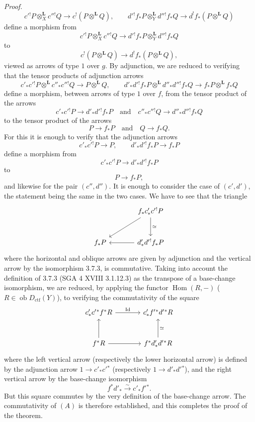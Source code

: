 \documentclass[11pt]{article}
\newenvironment{prooftext}[1][Proof]{\par\noindent\emph{#1.}\ }{\par\medskip}
\DeclareMathOperator{\Hom}{Hom}
\newcommand{\ob}{\operatorname{ob}}
\providecommand{\Dctf}{D_{\mathrm{ctf}}}
\providecommand{\Id}{\mathrm{Id}}
\providecommand{\lisom}{\xrightarrow{\sim}}
\providecommand{\Dctf}{D_{\mathrm{ctf}}}
\providecommand{\Hom}{\operatorname{Hom}}
\providecommand{\ob}{\operatorname{ob}}
\providecommand{\Hom}{\operatorname{Hom}}
\begin{document}
\begin{prooftext}[Proof]
\[
c'{}^!P\otimes_X^{\mathbf L}c''{}^!Q\longrightarrow c^!(P\otimes^{\mathbf L}Q),\qquad
d'{}^!f_*P\otimes_Y^{\mathbf L}d''{}^!f_*Q\longrightarrow d^!f_*(P\otimes^{\mathbf L}Q)
\]
define a morphism from
\[
c'{}^!P\otimes_X^{\mathbf L}c''{}^!Q\longrightarrow d'{}^!f_*P\otimes_Y^{\mathbf L}d''{}^!f_*Q
\]
to
\[
c^!(P\otimes^{\mathbf L}Q)\longrightarrow d^!f_*(P\otimes^{\mathbf L}Q),
\]
viewed as arrows of type $1$ over $g$. By adjunction, we are reduced to verifying that the tensor products of adjunction arrows
\[
c'_*c'{}^!P\otimes^{\mathbf L}c''_*c''{}^!Q\longrightarrow P\otimes^{\mathbf L}Q,
\qquad
d'_*d'{}^!f_*P\otimes^{\mathbf L}d''_*d''{}^!f_*Q
\longrightarrow f_*P\otimes^{\mathbf L}f_*Q
\]
define a morphism, between arrows of type $1$ over $f$, from the tensor product of the arrows
\[
c'_*c'{}^!P\longrightarrow d'_*d'{}^!f_*P\quad\text{and}\quad
c''_*c''{}^!Q\longrightarrow d''_*d''{}^!f_*Q
\]
to the tensor product of the arrows
\[
P\longrightarrow f_*P\quad\text{and}\quad Q\longrightarrow f_*Q.
\]
For this it is enough to verify that the adjunction arrows
\[
c'_*c'{}^!P\longrightarrow P,\qquad d'_*d'{}^!f_*P\longrightarrow f_*P
\]
define a morphism from
\[
c'_*c'{}^!P\longrightarrow d'_*d'{}^!f_*P
\]
to
\[
P\longrightarrow f_*P,
\]
and likewise for the pair $(c'',d'')$. It is enough to consider the case of $(c',d')$, the statement being the same in the two cases. We have to see that the triangle
\[
\begin{tikzcd}[column sep=large,row sep=large]
& f_*c'_*c'{}^!P \arrow[d,"\simeq"]\arrow[dl]\\
f_*P & d'_*d'{}^!f_*P\arrow[l]
\end{tikzcd}
\]
where the horizontal and oblique arrows are given by adjunction and the vertical arrow by the isomorphism 3.7.3, is commutative. Taking into account the definition of 3.7.3 (SGA 4 XVIII 3.1.12.3) as the transpose of a base-change isomorphism, we are reduced, by applying the functor $\Hom(R,-)$ ($R\in\ob\Dctf(Y)$), to verifying the commutativity of the square
\[
\begin{tikzcd}[column sep=large,row sep=large]
c'_*c'{}^*f^*R \arrow[r,"\Id"] &
c'_*f'{}^*d'{}^*R\\
f^*R \arrow[u] \arrow[r] &
f^*d'_*d'{}^*R\arrow[u,"\simeq"']
\end{tikzcd}
\]
where the left vertical arrow (respectively the lower horizontal arrow) is defined by the adjunction arrow $1\longrightarrow c'_*c'{}^*$ (respectively $1\longrightarrow d'_*d'{}^*$), and the right vertical arrow by the base-change isomorphism
\[
f^*d'_*\lisom c'_*f'{}^*.
\]
But this square commutes by the very definition of the base-change arrow. The commutativity of $(A)$ is therefore established, and this completes the proof of the theorem.
\end{prooftext}
\end{document}
